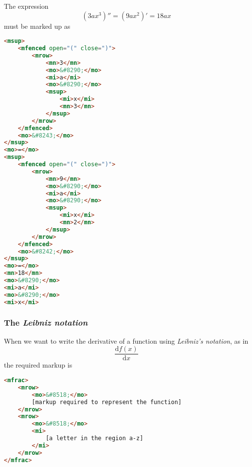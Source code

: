 \documentclass[english,a4paper,11pt]{article}
\begin{document}

\begin{eksempler}
The expression 
\begin{equation}
(3 a x^3)'' = (9 ax^2)' = 18 a x
\end{equation}
must be marked up as
\begin{lstlisting}[language=HTML]
<msup>
	<mfenced open="(" close=")">
		<mrow>
			<mn>3</mn>
			<mo>&#8290;</mo>
			<mi>a</mi>
			<mo>&#8290;</mo>
			<msup>
				<mi>x</mi>
				<mn>3</mn>
			</msup>
		</mrow>
	</mfenced>
	<mo>&#8243;</mo>
</msup>
<mo>=</mo>
<msup>
	<mfenced open="(" close=")">
		<mrow>
			<mn>9</mn>
			<mo>&#8290;</mo>
			<mi>a</mi>
			<mo>&#8290;</mo>
			<msup>
				<mi>x</mi>
				<mn>2</mn>
			</msup>
		</mrow>
	</mfenced>
	<mo>&#8242;</mo>
</msup>
<mo>=</mo>
<mn>18</mn>
<mo>&#8290;</mo>
<mi>a</mi>
<mo>&#8290;</mo>
<mi>x</mi>
\end{lstlisting}


\end{eksempler}

\subsubsection{The \emph{Leibniz notation}}
When we want to write the derivative of a function using \emph{Leibniz's notation}, as in
\begin{equation}
\frac{\text{d}f(x)}{\text{d}x}
\end{equation}
the required markup is

\begin{lstlisting}[language=HTML]
<mfrac>
	<mrow>
		<mo>&#8518;</mo>
		[markup required to represent the function]
	</mrow>
	<mrow>
		<mo>&#8518;</mo>
		<mi>
			[a letter in the region a-z]
		</mi>
	</mrow>
</mfrac>
\end{lstlisting}
\end{document}
